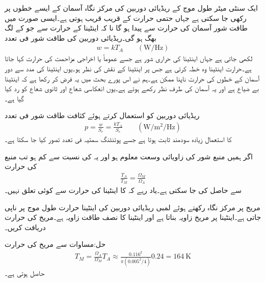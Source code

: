 ایک سنٹی میٹر طول موج کے ریڈیائی دوربین کی مرکز نگاہ  آسمان کے ایسے خطوں پر رکھی جا سکتی ہے جہاں حتمی حرارت  کے قریب قریب ہوتی ہے۔ایسی صورت میں طاقت شور آسمان کی حرارت سے پیدا ہو گا نا کہ اینٹینا کے حرارت سے جو  کے لگ بھگ  ہو گی۔ریڈیائی دوربین کی طاقت شور فی تعدد
\begin{align}
w=k T_A  \quad \quad (\si{\watt \per \hertz})
\end{align}
لکھی جاتی ہے جہاں  اینٹینا کی حراری شور ہے جسے عموماً  یا اخراجی مزاحمت کی حرارت کہا جاتا ہے۔حرارت اینٹینا وہ خطہ کرتی ہے جس پر اینٹینا کے نقش کی نظر ہو۔یوں اینٹینا کی مدد سے دور آسمان  کے خطوں کی حرارت ناپنا ممکن ہے۔ہم نے اس پورے بحث میں یہ فرض کر رکھا ہے کہ اینٹینا بے ضیاع ہے اور یہ آسمان کی طرف نظر رکھے ہوئے ہے۔یوں انعکاسی شعاع اور ثانوی شعاع کو رد کیا گیا ہے۔

ریڈیائی دوربین کو استعمال کرتے ہوئے  کثافت طاقت شور فی تعدد
\begin{align}
p=\frac{w}{S_e}=\frac{k T_A}{S_e} \quad \quad (\si{\watt \per \meter \squared \per\hertz})
\end{align} 
کا استعمال زیادہ سودمند ثابت ہوتا ہے جسے پوئنٹنگ سمتیہ فی تعدد تصور کیا جا سکتا ہے۔ 

اگر ہمیں منبع شور کی زاویائی وسعت  معلوم ہو اور یہ  کی نسبت سے کم ہو تب منبع کی حرارت
\begin{align}\label{مساوات_اینٹینا_ریڈیائی_حرارت}
\frac{T_A}{T_M}=\frac{\Omega_M}{\Omega_A}
\end{align}
سے حاصل کی جا سکتی ہے۔یاد رہے کہ  کا اینٹینا کی حرارت سے کوئی تعلق نہیں۔

مریخ پر مرکز نگاہ رکھتے ہوئے  لمبی ریڈیائی دوربین کی اینٹینا حرارت  طول موج پر  ناپی جاتی ہے۔اینٹینا پر مریخ  زاویہ بناتا ہے اور اینٹینا کا نصف طاقت زاویہ  ہے۔مریخ کی حرارت دریافت کریں۔

حل:مساوات  سے مریخ کی حرارت
\begin{align*}
T_M=\frac{\Omega_A}{\Omega_M}T_A \approx \frac{0.116^2}{\pi (0.005^2\!/\!4)} 0.24=\SI{164}{\kelvin}
\end{align*}
حاصل ہوتی ہے۔

